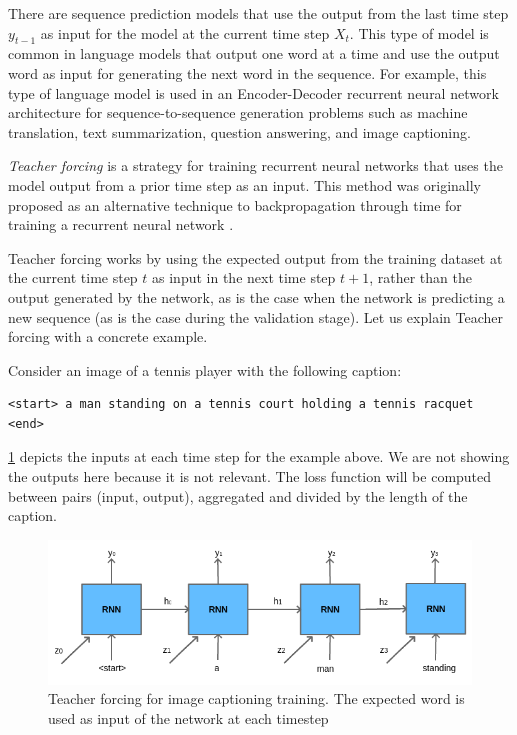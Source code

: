 There are sequence prediction models that use the output from the last time step $y_{t-1}$ as input for the model at the current time step $X_t$. This type of model is common in language models that output one word at a time and use the output word as input for generating the next word in the sequence.
For example, this type of language model is used in an Encoder-Decoder recurrent neural network architecture for sequence-to-sequence generation problems such as machine translation, text summarization, question answering, and image captioning.

\textit{Teacher forcing} is a strategy for training recurrent neural networks that uses the model output from a prior time step as an input. This method was originally proposed as an alternative technique to backpropagation through time for training a recurrent neural network \citep{Williams1989}.

Teacher forcing works by using the expected output from the training dataset at the current time step $t$ as input in the next time step $t+1$, rather than the output generated by the network, as is the case when the network is predicting a new sequence (as is the case during the validation stage). Let us explain Teacher forcing with a concrete example.

Consider an image of a tennis player with the following caption:

\begin{verbatim}
<start> a man standing on a tennis court holding a tennis racquet <end>    
\end{verbatim}

\cref{fig:teacher-forcing} depicts the inputs at each time step for the example above. We are not showing the outputs here because it is not relevant. The loss function will be computed between pairs (input, output), aggregated and divided by the length of the caption.

\begin{figure}[hpt]
    \centering
    \includegraphics[scale=0.5]{images/ch4/teacher-forcing.png}
    \caption{Teacher forcing for image captioning training. The expected word is used as input of the network at each timestep}
    \label{fig:teacher-forcing}
\end{figure}

